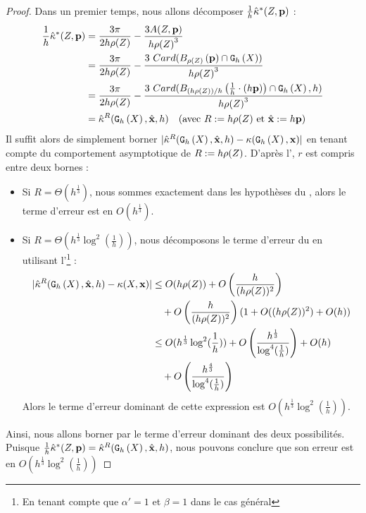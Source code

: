 \begin{proof}
  Dans un premier temps, nous allons décomposer
  $\frac{1}{h}\hat{\kappa}^{*}(Z,\mathbf{p})$ :
  \begin{align}
    \frac{1}{h}\hat{\kappa}^{*}(Z,\mathbf{p}) &= \frac{3\pi}{2 h\rho(Z)} - \frac{3 A(Z,\mathbf{p})}{h{\rho(Z)}^3} \\
    &= \frac{3\pi}{2 h\rho(Z)} - \frac{3~ Card(B_{\rho(Z)}\left(\mathbf{p}\right) \cap \mathtt{G}_{h}\left(X\right))}{h{\rho(Z)}^3} \\
    &= \frac{3\pi}{2 h\rho(Z)} - \frac{3~ Card( B_{(h\rho(Z))/h}\left(\frac{1}{h} \cdot (h\mathbf{p})\right) \cap \mathtt{G}_{h}\left(X\right), h)}{h{\rho(Z)}^3} \\
    &= \hat{\kappa}^{R}(\mathtt{G}_{h}\left(X\right),\hat{\mathbf{x}},h)\quad \text{(avec $R := h\rho(Z)$ et $\hat{\mathbf{x}} := h\mathbf{p}$)}
  \end{align}
  Il suffit alors de simplement borner $| \hat{\kappa}^{R}(\mathtt{G}_{h}\left(X\right),\hat{\mathbf{x}},h) -
  \kappa(\mathtt{G}_{h}\left(X\right),\mathbf{x}) |$ en tenant compte du comportement asymptotique de $R :=
  h\rho(Z)$. D'après l', $r$ est
  compris entre deux bornes :
  \begin{itemize}
    \item Si $R = \Theta(h^{\frac{1}{3}})$, nous sommes exactement dans les
    hypothèses du , alors le terme d'erreur
    est en $O( h^\frac{1}{3} )$.
    \item Si $R = \Theta(h^{\frac{1}{3}} \log^2 \left(\frac{1}{h}\right))$, nous
    décomposons le terme d'erreur du  en
    utilisant l'\footnote{En
    tenant compte que $\alpha' = 1$ et $\beta = 1$ dans le cas général} :
    \begin{align}
      |\hat{\kappa}^{R}(\mathtt{G}_{h}\left(X\right),\hat{\mathbf{x}},h) - \kappa(X,\mathbf{x})| & \le O(h\rho(Z)) + O\left(\frac{h}{(h\rho(Z))^{2}}\right) \nonumber\\
      &\quad + O\left(\frac{h}{(h\rho(Z))^{2}}\right)( 1 + O((h\rho(Z))^2) + O(h)) \\
      & \le O(h^{\frac{1}{3}} \log^2 (\frac{1}{h})) + O\left(\frac{h^\frac{1}{3}}{\log^4 (\frac{1}{h})}\right) + O( h ) \nonumber\\
      &\quad + O\left(\frac{h^\frac{4}{3}}{\log^4 (\frac{1}{h})}\right)
    \end{align}
    Alors le terme d'erreur dominant de cette expression est $O(h^{\frac{1}{3}}
    \log^2 (\frac{1}{h}))$.
  \end{itemize}
  Ainsi, nous allons borner par le terme d'erreur dominant des deux
  possibilités. Puisque
  $\frac{1}{h}\hat{\kappa}^{*}(Z,\mathbf{p})=\hat{\kappa}^{R}(\mathtt{G}_{h}\left(X\right),\hat{\mathbf{x}},h)$, nous pouvons
  conclure que son erreur est en $O(h^{\frac{1}{3}} \log^2 (\frac{1}{h}))$
\end{proof}


